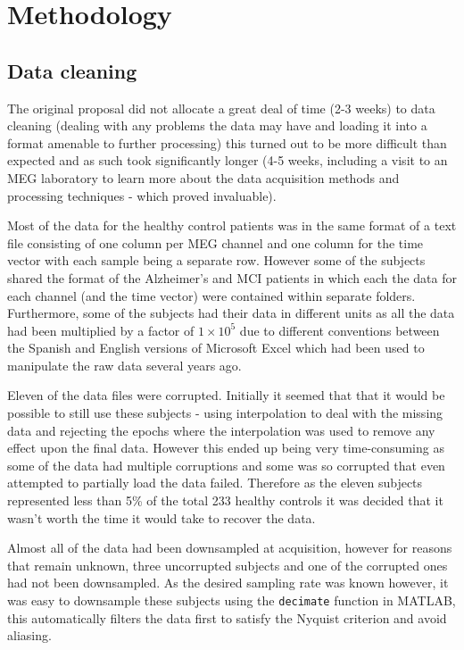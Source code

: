 \chapter{Methodology}

\section{Data cleaning}

The original proposal did not allocate a great deal of time (2-3 weeks) to data cleaning (dealing with any problems the data may have and loading it into a format amenable to further processing) this turned out to be more difficult than expected and as such took significantly longer (4-5 weeks, including a visit to an MEG laboratory to learn more about the data acquisition methods and processing techniques - which proved invaluable).

Most of the data for the healthy control patients was in the same format of a text file consisting of one column per MEG channel and one column for the time vector with each sample being a separate row. However some of the subjects shared the format of the Alzheimer's and MCI patients in which each the data for each channel (and the time vector) were contained within separate folders. Furthermore, some of the subjects had their data in different units as all the data had been multiplied by a factor of $1\times10^{5}$ due to different conventions between the Spanish and English versions of Microsoft Excel which had been used to manipulate the raw data several years ago.

Eleven of the data files were corrupted. Initially it seemed that that it would be possible to still use these subjects - using interpolation to deal with the missing data and rejecting the epochs where the interpolation was used to remove any effect upon the final data. However this ended up being very time-consuming as some of the data had multiple corruptions and some was so corrupted that even attempted to partially load the data failed. Therefore as the eleven subjects represented less than 5\% of the total 233 healthy controls it was decided that it wasn't worth the time it would take to recover the data.

Almost all of the data had been downsampled at acquisition, however for reasons that remain unknown, three uncorrupted subjects and one of the corrupted ones had not been downsampled. As the desired sampling rate was known however, it was easy to downsample these subjects using the \texttt{decimate} function in MATLAB, this automatically filters the data first to satisfy the Nyquist criterion and avoid aliasing.

